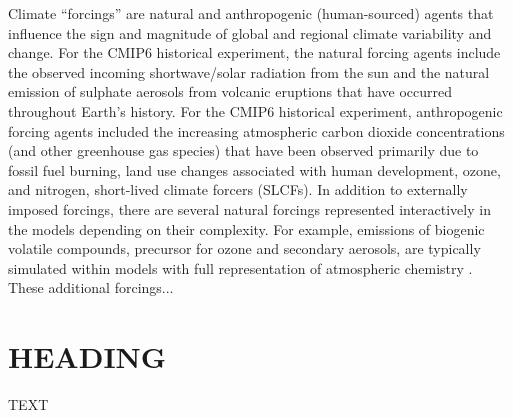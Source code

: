 \documentclass[gmd, preprint]{copernicus}
\begin{document}


\introduction  %
Climate “forcings” are natural and anthropogenic (human-sourced) agents that influence the sign and magnitude of global and regional climate variability and change. For the CMIP6 historical experiment, the natural forcing agents include the observed incoming shortwave/solar radiation from the sun and the natural emission of sulphate aerosols from volcanic eruptions that have occurred throughout Earth’s history. For the CMIP6 historical experiment, anthropogenic forcing agents included the increasing atmospheric carbon dioxide concentrations (and other greenhouse gas species) that have been observed primarily due to fossil fuel burning, land use changes associated with human development, ozone, and nitrogen, short-lived climate forcers (SLCFs). In addition to externally imposed forcings, there are several natural forcings represented interactively in the models depending on their complexity. For example, emissions of biogenic volatile compounds, precursor for ozone and secondary aerosols, are typically simulated within models with full representation of atmospheric chemistry \citep{thornhill_climate-driven_2021,young_pre-industrial_2013}. These additional forcings...


\section{HEADING}
TEXT
\end{document}
